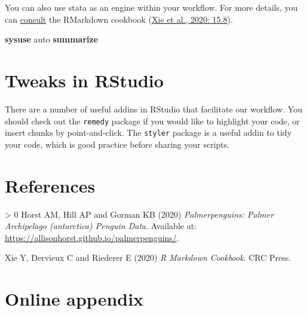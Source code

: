 \documentclass[
  11pt,
]{scrartcl}
\newenvironment{Shaded}{\begin{snugshade}}{\end{snugshade}}
\newcommand{\KeywordTok}[1]{\textcolor[rgb]{0.13,0.29,0.53}{\textbf{#1}}}
\newcommand{\NormalTok}[1]{#1}
\newlength{\cslhangindent}
\newenvironment{CSLReferences}[3] %
 {%
  \setlength{\parindent}{0pt}
  \ifodd #1 \everypar{\setlength{\hangindent}{\cslhangindent}}\ignorespaces\fi
  \ifnum #2 > 0
  \setlength{\parskip}{#2\baselineskip}
  \fi
 }%
 {}
\begin{document}
You can also use stata as an engine within your workflow. For more details, you can \href{https://bookdown.org/yihui/rmarkdown-cookbook/eng-stata.html}{consult} the RMarkdown cookbook (\protect\hyperlink{ref-Xie.2020}{Xie et al., 2020: 15.8}).

\begin{Shaded}
\begin{Highlighting}[]
\KeywordTok{sysuse}\NormalTok{ auto}
\KeywordTok{summarize}
\end{Highlighting}
\end{Shaded}

\hypertarget{tweaks-in-rstudio}{%
\section{Tweaks in RStudio}\label{tweaks-in-rstudio}}

There are a number of useful addins in RStudio that facilitate our workflow. You should check out the \texttt{remedy} package if you would like to highlight your code, or insert chunks by point-and-click. The \texttt{styler} package is a useful addin to tidy your code, which is good practice before sharing your scripts.

\newpage

\hypertarget{references}{%
\section{References}\label{references}}

\setlength{\parskip}{10pt}
\setlength{\parindent}{0pt}
\singlespacing

\hypertarget{refs}{}
\begin{CSLReferences}{1}{0}
\leavevmode\hypertarget{ref-palmerdata.2020}{}%
Horst AM, Hill AP and Gorman KB (2020) \emph{Palmerpenguins: Palmer Archipelago (antarctica) Penguin Data}. Available at: \url{https://allisonhorst.github.io/palmerpenguins/}.

\leavevmode\hypertarget{ref-Xie.2020}{}%
Xie Y, Dervieux C and Riederer E (2020) \emph{R Markdown Cookbook}. CRC Press.

\end{CSLReferences}

\newpage

\hypertarget{online-appendix}{%
\section{Online appendix}\label{online-appendix}}
\end{document}
